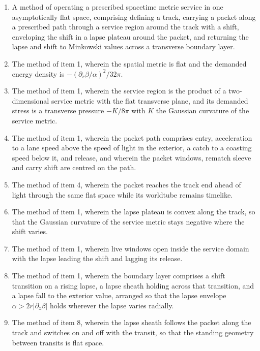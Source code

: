 \documentclass[11pt]{article}
\begin{document}
\begin{enumerate}
\item A method of operating a prescribed spacetime metric service in one asymptotically flat space, comprising defining a track, carrying a packet along a prescribed path through a service region around the track with a shift, enveloping the shift in a lapse plateau around the packet, and returning the lapse and shift to Minkowski values across a transverse boundary layer.

\item The method of item 1, wherein the spatial metric is flat and the demanded energy density is $-(\partial_r\beta/\alpha)^2/32\pi$.

\item The method of item 1, wherein the service region is the product of a two-dimensional service metric with the flat transverse plane, and its demanded stress is a transverse pressure $-K/8\pi$ with $K$ the Gaussian curvature of the service metric.

\item The method of item 1, wherein the packet path comprises entry, acceleration to a lane speed above the speed of light in the exterior, a catch to a coasting speed below it, and release, and wherein the packet windows, rematch sleeve and carry shift are centred on the path.

\item The method of item 4, wherein the packet reaches the track end ahead of light through the same flat space while its worldtube remains timelike.

\item The method of item 1, wherein the lapse plateau is convex along the track, so that the Gaussian curvature of the service metric stays negative where the shift varies.

\item The method of item 1, wherein live windows open inside the service domain with the lapse leading the shift and lagging its release.

\item The method of item 1, wherein the boundary layer comprises a shift transition on a rising lapse, a lapse sheath holding across that transition, and a lapse fall to the exterior value, arranged so that the lapse envelope $\alpha>2r|\partial_z\beta|$ holds wherever the lapse varies radially.

\item The method of item 8, wherein the lapse sheath follows the packet along the track and switches on and off with the transit, so that the standing geometry between transits is flat space.


\end{enumerate}
\end{document}
